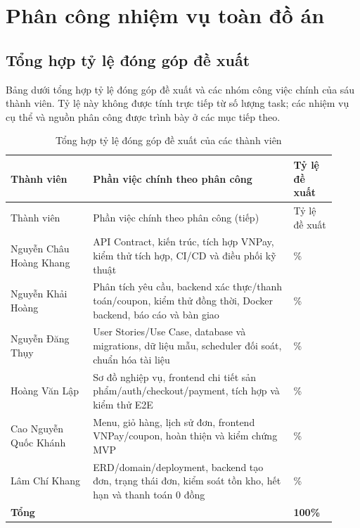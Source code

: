 \section{Phân công nhiệm vụ toàn đồ án}
\label{sec:task-allocation}
\subsection*{Tổng hợp tỷ lệ đóng góp đề xuất}
Bảng dưới tổng hợp tỷ lệ đóng góp đề xuất và các nhóm công việc chính của sáu thành viên. Tỷ lệ này không được tính trực tiếp từ số lượng task; các nhiệm vụ cụ thể và nguồn phân công được trình bày ở các mục tiếp theo.

\begingroup\small
\setlength{\tabcolsep}{4pt}\renewcommand{\arraystretch}{1.2}
\begin{longtable}{>{\raggedright\arraybackslash}p{0.23\linewidth}>{\raggedright\arraybackslash}p{0.57\linewidth}>{\centering\arraybackslash}p{0.12\linewidth}}
\caption{Tổng hợp tỷ lệ đóng góp đề xuất của các thành viên}\label{tab:contribution-proposal}\\
\toprule Thành viên & Phần việc chính theo phân công & Tỷ lệ đề xuất \\ \midrule\endfirsthead
\toprule Thành viên & Phần việc chính theo phân công (tiếp) & Tỷ lệ đề xuất \\ \midrule\endhead
\bottomrule\endlastfoot
Nguyễn Châu Hoàng Khang & API Contract, kiến trúc, tích hợp VNPay, kiểm thử tích hợp, CI/CD và điều phối kỹ thuật & 22\% \\ \addlinespace[4pt]
Nguyễn Khải Hoàng & Phân tích yêu cầu, backend xác thực/thanh toán/coupon, kiểm thử đồng thời, Docker backend, báo cáo và bàn giao & 19\% \\ \addlinespace[4pt]
Nguyễn Đăng Thụy & User Stories/Use Case, database và migrations, dữ liệu mẫu, scheduler đối soát, chuẩn hóa tài liệu & 16\% \\ \addlinespace[4pt]
Hoàng Văn Lập & Sơ đồ nghiệp vụ, frontend chi tiết sản phẩm/auth/checkout/payment, tích hợp và kiểm thử E2E & 13\% \\ \addlinespace[4pt]
Cao Nguyễn Quốc Khánh & Menu, giỏ hàng, lịch sử đơn, frontend VNPay/coupon, hoàn thiện và kiểm chứng MVP & 15\% \\ \addlinespace[4pt]
Lâm Chí Khang & ERD/domain/deployment, backend tạo đơn, trạng thái đơn, kiểm soát tồn kho, hết hạn và thanh toán 0 đồng & 15\% \\
\midrule \textbf{Tổng} & & \textbf{100\%} \\
\end{longtable}\endgroup
\clearpage

